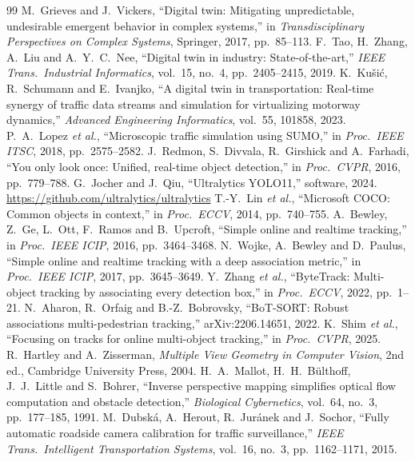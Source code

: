 \documentclass[11pt,a4paper]{article}
\begin{document}
\begin{thebibliography}{99}\small
{} M.~Grieves and J.~Vickers, ``Digital twin: Mitigating unpredictable, undesirable emergent behavior in complex systems,'' in \emph{Transdisciplinary Perspectives on Complex Systems}, Springer, 2017, pp.~85--113.
 F.~Tao, H.~Zhang, A.~Liu and A.~Y.~C.~Nee, ``Digital twin in industry: State-of-the-art,'' \emph{IEEE Trans.\ Industrial Informatics}, vol.~15, no.~4, pp.~2405--2415, 2019.
 K.~Ku\v{s}i\'{c}, R.~Schumann and E.~Ivanjko, ``A digital twin in transportation: Real-time synergy of traffic data streams and simulation for virtualizing motorway dynamics,'' \emph{Advanced Engineering Informatics}, vol.~55, 101858, 2023.
 P.~A.~Lopez \emph{et al.}, ``Microscopic traffic simulation using SUMO,'' in \emph{Proc.\ IEEE ITSC}, 2018, pp.~2575--2582.
 J.~Redmon, S.~Divvala, R.~Girshick and A.~Farhadi, ``You only look once: Unified, real-time object detection,'' in \emph{Proc.\ CVPR}, 2016, pp.~779--788.
 G.~Jocher and J.~Qiu, ``Ultralytics YOLO11,'' software, 2024. \url{https://github.com/ultralytics/ultralytics}
 T.-Y.~Lin \emph{et al.}, ``Microsoft COCO: Common objects in context,'' in \emph{Proc.\ ECCV}, 2014, pp.~740--755.
 A.~Bewley, Z.~Ge, L.~Ott, F.~Ramos and B.~Upcroft, ``Simple online and realtime tracking,'' in \emph{Proc.\ IEEE ICIP}, 2016, pp.~3464--3468.
 N.~Wojke, A.~Bewley and D.~Paulus, ``Simple online and realtime tracking with a deep association metric,'' in \emph{Proc.\ IEEE ICIP}, 2017, pp.~3645--3649.
 Y.~Zhang \emph{et al.}, ``ByteTrack: Multi-object tracking by associating every detection box,'' in \emph{Proc.\ ECCV}, 2022, pp.~1--21.
 N.~Aharon, R.~Orfaig and B.-Z.~Bobrovsky, ``BoT-SORT: Robust associations multi-pedestrian tracking,'' arXiv:2206.14651, 2022.
 K.~Shim \emph{et al.}, ``Focusing on tracks for online multi-object tracking,'' in \emph{Proc.\ CVPR}, 2025.
 R.~Hartley and A.~Zisserman, \emph{Multiple View Geometry in Computer Vision}, 2nd ed., Cambridge University Press, 2004.
 H.~A.~Mallot, H.~H.~B\"{u}lthoff, J.~J.~Little and S.~Bohrer, ``Inverse perspective mapping simplifies optical flow computation and obstacle detection,'' \emph{Biological Cybernetics}, vol.~64, no.~3, pp.~177--185, 1991.
 M.~Dubsk\'{a}, A.~Herout, R.~Jur\'{a}nek and J.~Sochor, ``Fully automatic roadside camera calibration for traffic surveillance,'' \emph{IEEE Trans.\ Intelligent Transportation Systems}, vol.~16, no.~3, pp.~1162--1171, 2015.

\end{thebibliography}
\end{document}
